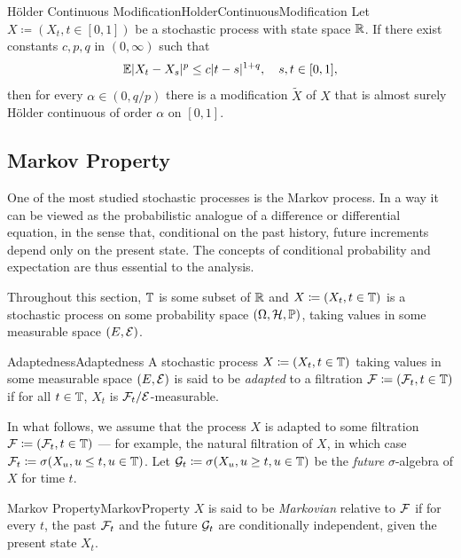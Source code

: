 \begin{thm}{Hölder Continuous Modification}{HolderContinuousModification}
    Let $X \coloneqq (X_t, t \in [0, 1])$ be a stochastic process with state space $\mathbb{R}$. If there exist constants $c, p, q$ in $(0, \infty)$ such that
    \begin{equation}\label{eq:KolmogorovChentsovCondition}
        \mathbb{E}|X_t - X_s|^p \leq c |t - s|^{1+q}, \quad s, t \in [0, 1],
    \end{equation}
    then for every $\alpha \in (0, q/p)$ there is a modification $\widetilde{X}$ of $X$ that is almost surely Hölder continuous of order $\alpha$ on $[0, 1]$.
\end{thm}

\subsection{Markov Property}
One of the most studied stochastic processes is the Markov process. In a way it can be viewed as the probabilistic analogue of a difference or differential equation, in the sense that, conditional on the past history, future increments depend only on the present state. The concepts of conditional probability and expectation are thus essential to the analysis.

Throughout this section, $\mathbb{T}$ is some subset of $\mathbb{R}$ and $X \coloneqq (X_t, t \in \mathbb{T})$ is a stochastic process on some probability space $(\Omega, \mathcal{H}, \mathbb{P})$, taking values in some measurable space $(E, \mathcal{E})$.

\begin{defn}{Adaptedness}{Adaptedness}
    A stochastic process $X \coloneqq (X_t, t \in \mathbb{T})$ taking values in some measurable space $(E, \mathcal{E})$ is said to be \emph{adapted} to a filtration $\mathcal{F} \coloneqq (\mathcal{F}_t, t \in \mathbb{T})$ if for all $t \in \mathbb{T}$, $X_t$ is $\mathcal{F}_t/\mathcal{E}$-measurable.
\end{defn}

In what follows, we assume that the process $X$ is adapted to some filtration $\mathcal{F} \coloneqq (\mathcal{F}_t, t \in \mathbb{T})$ --- for example, the natural filtration of $X$, in which case $\mathcal{F}_t \coloneqq \sigma(X_u, u \leq t, u \in \mathbb{T})$. Let $\mathcal{G}_t \coloneqq \sigma(X_u, u \geq t, u \in \mathbb{T})$ be the \textit{future} $\sigma$-algebra of $X$ for time $t$.

\begin{defn}{Markov Property}{MarkovProperty}
    $X$ is said to be \emph{Markovian} relative to $\mathcal{F}$ if for every $t$, the past $\mathcal{F}_t$ and the future $\mathcal{G}_t$ are conditionally independent, given the present state $X_t$.
\end{defn}

